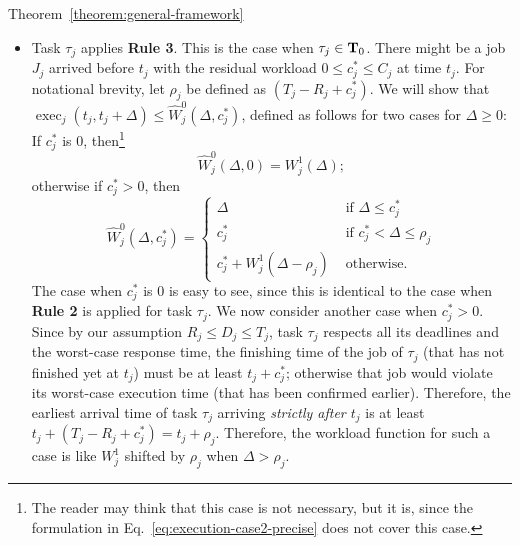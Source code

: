 \begin{appProof}{Theorem~\ref{theorem:general-framework}}
\begin{itemize}
\item Task $\tau_j$ applies {\bf Rule 3}. This is the case when
  $\tau_j \in {\bf T}_0$. There might be a job $J_j$ arrived before
  $t_j$ with the residual workload $0 \leq c_j^* \leq C_j$ at time
  $t_j$. For notational brevity, let $\rho_j$ be defined as $(T_j-R_j +
  c_j^*)$. We will show that $\operatorname{exec}_j(t_j, t_j+\Delta) \leq
  \widehat{W}_j^0(\Delta, c_j^*)$, defined as follows for two cases for $\Delta \geq 0$:
  If $c_j^*$ is $0$, then\footnote{The reader may think that this case
    is not necessary, but it is, since the formulation in
    Eq.~\eqref{eq:execution-case2-precise} does not cover this case.}
  \begin{equation}
  \label{eq:execution-case2-cj*=0}
 \widehat{W}_j^0(\Delta, 0)=    W_j^1(\Delta);
  \end{equation}
  otherwise if $c_j^* > 0$, then
  \begin{equation}
    \label{eq:execution-case2-precise}
    \widehat{W}_j^0(\Delta, c_j^*)=
    \begin{cases}
      \Delta & \mbox{ if } \Delta \leq  c_j^*\\
      c_j^* & \mbox{ if } c_j^* < \Delta \leq  \rho_j\\
      c_j^* + W_j^1(\Delta-\rho_j) & \mbox{ otherwise}.
    \end{cases}
  \end{equation}
  The case when $c_j^*$ is $0$ is easy to see, since this is identical to
  the case when {\bf Rule 2} is applied for task $\tau_j$. We now consider another case when $c_j^* > 0$.
  Since by our assumption $R_j \leq D_j \leq T_j$, task $\tau_j$ respects all its deadlines and the
  worst-case response time, the finishing time of the job of $\tau_j$ (that has not finished yet at $t_j$) must be at least $t_j + c_j^*$; otherwise that job would violate its worst-case execution time (that has been confirmed earlier). Therefore, the earliest arrival time of task $\tau_j$
  arriving \emph{strictly after $t_j$} is at least $t_j + (T_j-R_j +
  c_j^*) = t_j+\rho_j$. Therefore, the workload function for such a case is like $W_j^1$ shifted by $\rho_j$ when $\Delta > \rho_j$.
\end{itemize}



\end{appProof}
